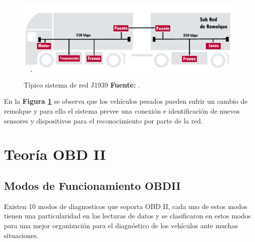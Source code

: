 \begin{figure}[H]
	\centering
	\includegraphics[width=1\textwidth]{./Cap3imagen/trailer.pdf}
	\caption [Típico sistema de red J1939.]{Típico sistema de red J1939\textbf{ Fuente:} \cite{cite_trailer_c3}.}
	\label{fig_trailer_c3} %
\end{figure}

En la \textbf{Figura \ref{fig_trailer_c3}} se observa que los vehículos pesados pueden sufrir un cambio de remolque y para ello el sistema prevee una conexión e identificación de nuevos sensores y dispositivos para el reconocimiento por parte de la red. 



\section{Teoría OBD II}

\subsection{Modos de Funcionamiento OBDII}

Existen 10 modos de diagnosticos que soporta OBD II, cada uno de estos modos tienen una particularidad en las lecturas de datos y se clasificaron en estos modos para una mejor organización para el diagnóstico de los vehículos ante muchas situaciones.

